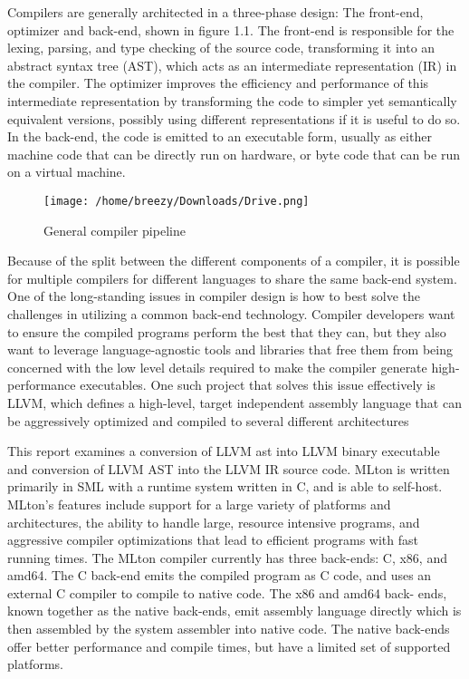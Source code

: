 \documentclass{book}
\begin{document}
Compilers are generally architected in a three-phase design: The front-end, optimizer
and back-end, shown in figure 1.1. The front-end is responsible for the lexing, parsing, and
type checking of the source code, transforming it into an abstract syntax tree (AST), which
acts as an intermediate representation (IR) in the compiler. The optimizer improves the
efficiency and performance of this intermediate representation by transforming the code to
simpler yet semantically equivalent versions, possibly using different representations if it
is useful to do so. In the back-end, the code is emitted to an executable form, usually as
either machine code that can be directly run on hardware, or byte code that can be run on a
virtual machine.\linebreak \linebreak 
\begin{figure}
	\texttt{[image: /home/breezy/Downloads/Drive.png]}
	\caption{General compiler pipeline}
	\label{fig:1.1}
\end{figure} Because of the split between the different components of a compiler, it is possible for
multiple compilers for different languages to share the same back-end system. One of the
long-standing issues in compiler design is how to best solve the challenges in utilizing a
common back-end technology. Compiler developers want to ensure the compiled programs
perform the best that they can, but they also want to leverage language-agnostic tools and
libraries that free them from being concerned with the low level details required to make the compiler generate high-performance executables.  One such project that solves this issue
effectively is LLVM, which defines a high-level, target independent assembly language
that can be aggressively optimized and compiled to several different architectures 

 This  report  examines  a conversion of LLVM ast into LLVM binary executable and conversion of LLVM AST into the LLVM IR source code. MLton
is written primarily in SML with a runtime system written in C, and is able to self-host.
MLton's  features  include  support  for  a  large  variety  of  platforms  and  architectures,  the
ability to handle large, resource intensive programs, and aggressive compiler optimizations
that lead to efficient programs with fast running times. The MLton compiler currently has
three back-ends:  C, x86, and amd64.  The C back-end emits the compiled program as C
code, and uses an external C compiler to compile to native code. The x86 and amd64 back-
ends, known together as the native back-ends, emit assembly language directly which is
then assembled by the system assembler into native code. The native back-ends offer better
performance and compile times, but have a limited set of supported platforms.
\end{document}
